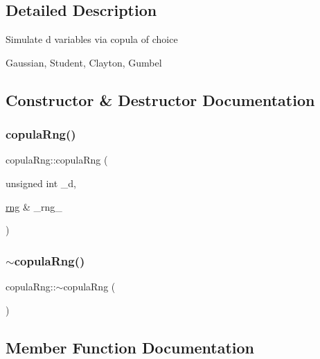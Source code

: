 \subsection{Detailed Description}
Simulate d variables via copula of choice

Gaussian, Student, Clayton, Gumbel 

\subsection{Constructor \& Destructor Documentation}
\hypertarget{classcopulaRng_a223e069676a02b38f8bb2cafa242cf54}{}\label{classcopulaRng_a223e069676a02b38f8bb2cafa242cf54} 
\subsubsection{\texorpdfstring{copula\+Rng()}{copulaRng()}}
{\footnotesize\ttfamily copula\+Rng\+::copula\+Rng (\begin{DoxyParamCaption}\item[{unsigned int}]{\+\_\+d,  }\item[{\hyperlink{classrng}{rng} \&}]{\+\_\+rng\+\_\+ }\end{DoxyParamCaption})}

\hypertarget{classcopulaRng_a2adb46d54717a4c76f9a46245ee3cacc}{}\label{classcopulaRng_a2adb46d54717a4c76f9a46245ee3cacc} 
\subsubsection{\texorpdfstring{$\sim$copula\+Rng()}{~copulaRng()}}
{\footnotesize\ttfamily copula\+Rng\+::$\sim$copula\+Rng (\begin{DoxyParamCaption}{ }\end{DoxyParamCaption})\hspace{0.3cm}{\ttfamily [inline]}}



\subsection{Member Function Documentation}
\hypertarget{classcopulaRng_a8da7d9a900602dfbb03fff3a627a8763}{}\label{classcopulaRng_a8da7d9a900602dfbb03fff3a627a8763} 
